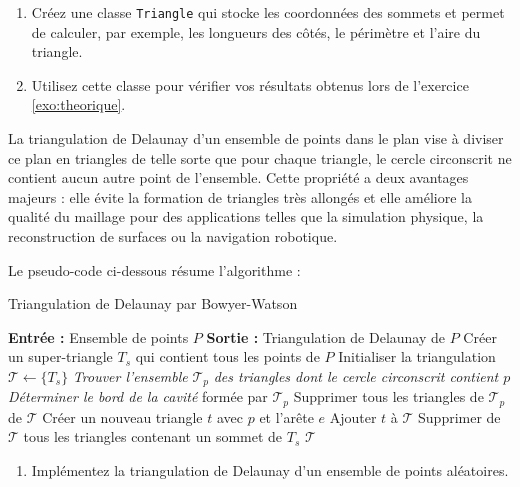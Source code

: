 \documentclass[a4paper,12pt]{article}
\theoremstyle{definition}
\begin{document}
\label{exo:triangle}
\begin{enumerate}
  \item Créez une classe \texttt{Triangle} qui stocke les coordonnées des sommets et permet de calculer, par exemple, les longueurs des côtés, le périmètre et l’aire du triangle. 
  \item Utilisez cette classe pour vérifier vos résultats obtenus lors de l'exercice \ref{exo:theorique}.
\end{enumerate} 




La triangulation de Delaunay d'un ensemble de points dans le plan vise à diviser ce plan en triangles de telle sorte que pour chaque triangle, le cercle circonscrit ne contient aucun autre point de l'ensemble. Cette propriété a deux avantages majeurs : elle évite la formation de triangles très allongés et elle améliore la qualité du maillage pour des applications telles que la simulation physique, la reconstruction de surfaces ou la navigation robotique.

Le pseudo-code ci-dessous résume l'algorithme :

\begin{algorithm}
\caption{Triangulation de Delaunay par Bowyer-Watson}
\begin{algorithmic}[1]
\State \textbf{Entrée :} Ensemble de points \(P\)
\State \textbf{Sortie :} Triangulation de Delaunay de \(P\)
\State Créer un super-triangle \(T_s\) qui contient tous les points de \(P\)
\State Initialiser la triangulation \(\mathcal{T} \gets \{T_s\}\)
    \State \emph{Trouver l'ensemble} \(\mathcal{T}_p\) \emph{des triangles dont le cercle circonscrit contient \(p\)}
    \State \emph{Déterminer le bord de la cavité} formée par \(\mathcal{T}_p\)
    \State Supprimer tous les triangles de \(\mathcal{T}_p\) de \(\mathcal{T}\)
         \State Créer un nouveau triangle \(t\) avec \(p\) et l'arête \(e\)
         \State Ajouter \(t\) à \(\mathcal{T}\)
    \EndFor
\EndFor
\State Supprimer de \(\mathcal{T}\) tous les triangles contenant un sommet de \(T_s\)
\State \Return \(\mathcal{T}\)
\end{algorithmic}
\end{algorithm}

\begin{enumerate}
  \item Implémentez la triangulation de Delaunay d'un ensemble de points aléatoires.
\end{enumerate}
\end{document}
